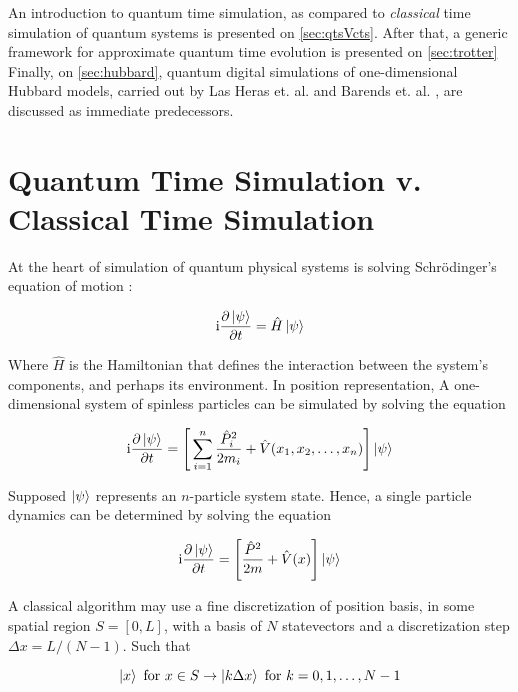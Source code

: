 An introduction to quantum time simulation, as compared to \textit{classical} time simulation of quantum systems is presented on \autoref{sec:qtsVcts}. After that, a generic framework for approximate quantum time evolution is presented on \autoref{sec:trotter} Finally, on \autoref{sec:hubbard}, quantum digital simulations of one-dimensional Hubbard models, carried out by Las Heras et. al. \cite{HubbardSimulLasHeras} and Barends et. al. \cite{HubbardSimul}, are discussed as immediate predecessors.

\section{Quantum Time Simulation v. Classical Time Simulation}
\label{sec:qtsVcts}

  At the heart of simulation of quantum physical systems is solving Schrödinger's equation of motion \cite{Beck, Nielsen}:

  \begin{equation}
  \mathrm{i}
  \label{eq:SchEqn}\pdv{\ket{\psi}}{t} = \hat{H} \ket{\psi}
  \end{equation}

  Where $\hat{H}$ is the Hamiltonian that defines the interaction between the system's components, and perhaps its environment. In position representation, A one-dimensional system of spinless particles can be simulated by solving the equation

  \begin{equation}
  \mathrm{i}\pdv{\ket{\psi}}{t} = \Bigg[\sum_{i = 1}^{n} \frac{\hat{P}_i^2}{2m_i} + \hat{V}(x_1, x_2, \ldots, x_n)\Bigg] \ket{\psi}
  \end{equation}

  Supposed $\ket{\psi}$ represents an $n$-particle system state. Hence, a single particle dynamics can be determined by solving the equation

  \begin{equation}
  \mathrm{i}\pdv{\ket{\psi}}{t} = \Bigg[\frac{\hat{P}^2}{2m} + \hat{V}(x)\Bigg] \ket{\psi}
  \end{equation}

  A classical algorithm may use a fine discretization of position basis, in some spatial region $\mathit{S} = [0,L]$, with a basis of $N$ statevectors and a discretization step $\Delta x = L/(N-1)$. Such that

  \begin{equation}
    \ket{x} \text{ for } x \in S \rightarrow \ket{k \Delta x} \text{ for } k = 0,1,\ldots,N-1
  \end{equation}

